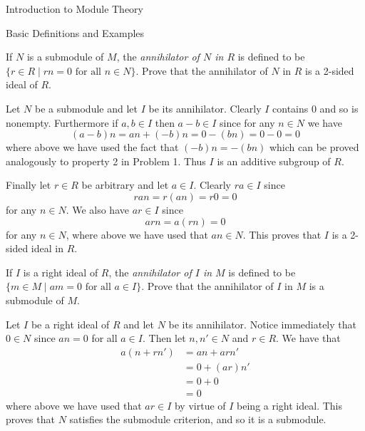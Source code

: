 \begin{chapter}{Introduction to Module Theory}
\begin{section}{Basic Definitions and Examples}
\begin{problem}\label{ex:10.1.9}
If $N$ is a submodule of $M$, the \emph{annihilator of $N$ in $R$} is defined to be $\{r\in R\mid rn=0 \text{ for all } n\in N\}$. Prove that the annihilator of $N$ in $R$ is a 2-sided ideal of $R$. 
\end{problem}
\begin{solution}
Let $N$ be a submodule and let $I$ be its annihilator. Clearly $I$ contains 0 and so is nonempty. Furthermore if $a,b\in I$ then $a-b\in I$ since for any $n\in N$ we have \[
(a-b)n = an + (-b)n = 0 -(bn) = 0-0 = 0
\]
where above we have used the fact that $(-b)n = -(bn)$ which can be proved analogously to property 2 in Problem 1. Thus $I$ is an additive subgroup of $R$. 

Finally let $r\in R$ be arbitrary and let $a\in I$. Clearly $ra\in I$ since \[
ran = r(an) = r0 = 0
\]
for any $n\in N$. We also have $ar\in I$ since \[
arn = a(rn) = 0
\]
for any $n\in N$, where above we have used that $an\in N$. This proves that $I$ is a 2-sided ideal in $R$.
\end{solution}\oneperpage



\begin{problem}\label{ex:10.1.10}
If $I$ is a right ideal of $R$, the \emph{annihilator of $I$ in $M$} is defined to be $\{m\in M \mid am=0\text{ for all } a\in I\}$. Prove that the annihilator of $I$ in $M$ is a submodule of $M$.
\end{problem}
\begin{solution}
Let $I$ be a right ideal of $R$ and let $N$ be its annihilator. Notice immediately that $0\in N$ since $an = 0$ for all $a\in I$. Then let $n,n'\in N$ and $r\in R$. We have that \begin{align*}
a(n+rn') &= an + arn'\\
& = 0 + (ar)n'\\
& = 0+0\\
& = 0
\end{align*}
where above we have used that $ar\in I$ by virtue of $I$ being a right ideal. This proves that $N$ satisfies the submodule criterion, and so it is a submodule. 
\end{solution}\oneperpage




\end{section}
\end{chapter}
